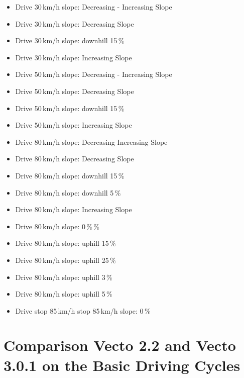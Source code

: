 \begin{itemize}
\item Drive 30\,km/h slope: Decreasing - Increasing Slope
\item Drive 30\,km/h slope: Decreasing Slope
\item Drive 30\,km/h slope: downhill 15\,\%
\item Drive 30\,km/h slope: Increasing Slope
\item Drive 50\,km/h slope: Decreasing - Increasing Slope
\item Drive 50\,km/h slope: Decreasing Slope
\item Drive 50\,km/h slope: downhill 15\,\%
\item Drive 50\,km/h slope: Increasing Slope
\item Drive 80\,km/h slope: Decreasing Increasing Slope
\item Drive 80\,km/h slope: Decreasing Slope
\item Drive 80\,km/h slope: downhill 15\,\%
\item Drive 80\,km/h slope: downhill 5\,\%
\item Drive 80\,km/h slope: Increasing Slope
\item Drive 80\,km/h slope:  0\,\%\,\%
\item Drive 80\,km/h slope: uphill 15\,\%
\item Drive 80\,km/h slope: uphill 25\,\%
\item Drive 80\,km/h slope: uphill 3\,\%
\item Drive 80\,km/h slope: uphill 5\,\%
\item Drive stop 85\,km/h stop 85\,km/h slope:  0\,\%
\end{itemize}


\section{Comparison Vecto 2.2 and Vecto 3.0.1 on the Basic Driving Cycles} %
\label{sec:comparison_vecto_2_2_and_vecto_3_0_1_on_the_basic_driving_cycles}




